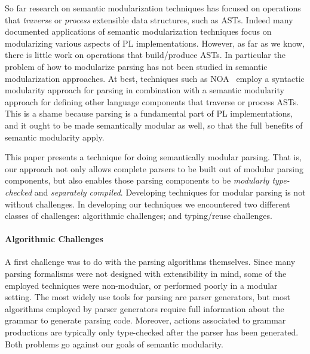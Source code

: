 So far research on semantic modularization techniques has focused on
operations that \emph{traverse} or \emph{process} extensible
data structures, such as ASTs. Indeed many documented applications of
semantic modularization techniques focus on modularizing various
aspects of PL implementations.  However, as far as we know, there is
little work on operations that build/produce ASTs.  In particular the
problem of how to modularize parsing has not been studied in semantic
modularization approaches. At best, techniques such as NOA~\cite{Gouseti2014}
employ a syntactic modularity approach for parsing in combination with
a semantic modularity approach for defining other language components
that traverse or process ASTs. This is a shame because parsing is a
fundamental part of PL implementations, and it ought to be made
semantically modular as well, so that the full benefits of semantic
modularity apply.


This paper presents a technique for doing semantically
modular parsing.  That is, our approach not only allows complete
parsers to be built out of modular parsing components, but also enables
those parsing components to be \emph{modularly type-checked} and
\emph{separately compiled}. Developing techniques for modular parsing
is not without challenges. In developing our techniques we encountered
two different classes of challenges: algorithmic challenges; and
typing/reuse challenges.

\paragraph{Algorithmic Challenges} A first challenge was to do with
  the parsing algorithms themselves. Since many parsing formalisms
  were not designed with extensibility in mind, some of the employed
  techniques were non-modular, or performed poorly in a modular
  setting.  The most widely use tools for parsing are parser
  generators, but most algorithms employed by parser generators
  require full information about the grammar to generate parsing
  code. Moreover, actions associated to grammar productions are
  typically only type-checked after the parser has been
  generated. Both problems go against our goals of semantic
  modularity.

